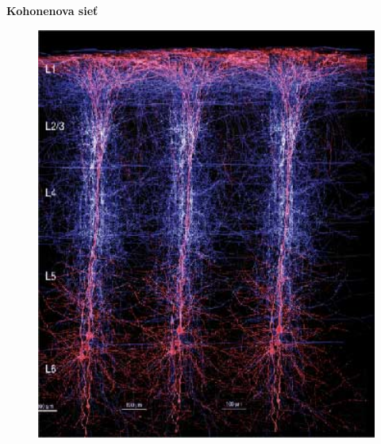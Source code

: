 \documentclass[xcolor=dvipsnames]{beamer}
\begin{document}
\begin{frame}{\bf Kohonenova sieť}

\begin{figure}[ht]
\begin{center}
\begin{minipage}{0.6\linewidth}
\begin{center}
\includegraphics[width=1.0\textwidth]{images/cortical_column.jpg}
\end{center}
\end{minipage}
\end{center}
\end{figure}

\end{frame}
\end{document}
